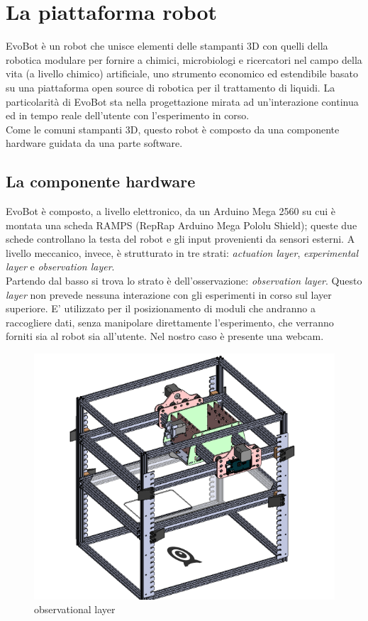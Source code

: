 \chapter{La piattaforma robot}

\label{cha:789}
EvoBot è un robot che unisce elementi delle stampanti 3D con quelli della robotica modulare per fornire a chimici, microbiologi e ricercatori nel campo della vita (a livello chimico) artificiale, uno strumento economico ed estendibile basato su una piattaforma open source di robotica per il trattamento di liquidi. La particolarità di EvoBot sta nella progettazione mirata ad un'interazione continua ed in tempo reale dell'utente con l'esperimento in corso.\cite{introd-robot}
\\Come le comuni stampanti 3D,  questo robot è composto da una componente hardware guidata da una parte software. 

\section{La componente hardware}
EvoBot è composto, a livello elettronico, da un Arduino Mega 2560 su cui è montata una scheda RAMPS (RepRap Arduino Mega Pololu Shield); queste due schede controllano la testa del robot e gli input provenienti da sensori esterni. 
A livello meccanico, invece, è strutturato in tre strati: \emph{actuation layer}, \emph{experimental layer} e  \emph{observation layer}.
\\Partendo dal basso si trova lo strato è dell'osservazione: \emph{observation layer}. Questo \emph{layer} non prevede nessuna interazione con gli esperimenti in corso sul layer superiore. E' utilizzato per il posizionamento di moduli che andranno a raccogliere dati, senza manipolare direttamente l'esperimento, che verranno forniti sia al robot sia all'utente. Nel nostro caso è presente una webcam. 
	\begin{figure}[h]
	  \includegraphics[scale=0.40]{immagini/observational-layer.png}
	\centering
	 \caption{observational layer}
	\end{figure} 

